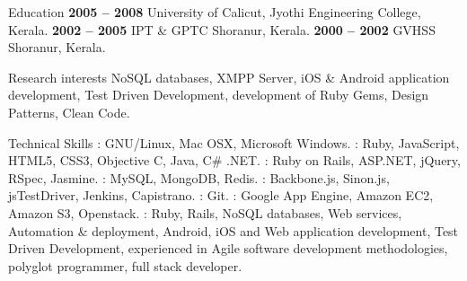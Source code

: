 \documentclass{resume}
\author{Abhilash M A}
\begin{document}
\maketitle


\begin{category}{Education}
   \hfill \textbf{2005 -- 2008}
  \citemnobullet University of Calicut, Jyothi Engineering College, Kerala.
   \hfill \textbf{2002 -- 2005}
  \citemnobullet IPT \& GPTC Shoranur, Kerala.
   \hfill \textbf{2000 -- 2002}
  \citemnobullet GVHSS Shoranur, Kerala.
\end{category}


\begin{category}{Research interests}
  \citemnobullet NoSQL databases, XMPP Server, iOS \& Android application development,
  Test Driven Development, development of Ruby Gems, Design Patterns, Clean Code.
\end{category}

\begin{category}{Technical Skills}
  : GNU/Linux, Mac OSX, Microsoft Windows.
  : Ruby, JavaScript, HTML5, CSS3,
  Objective C, Java, C\# .NET.
  : Ruby on Rails, ASP.NET, jQuery, RSpec, Jasmine.
  : MySQL, MongoDB, Redis.
  : Backbone.js, Sinon.js, jsTestDriver,
  Jenkins, Capistrano.
  : Git.
  : Google App Engine, Amazon EC2,
  Amazon S3, Openstack.
  : Ruby, Rails, NoSQL databases, Web services, Automation \& deployment, 
  Android, iOS and Web application development, Test Driven
  Development, experienced in Agile software development
  methodologies, polyglot programmer, full stack developer.
\end{category}

\end{document}
